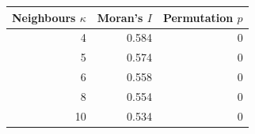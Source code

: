 \begin{tabular}{rrr}
\toprule
Neighbours $\kappa$ & Moran's $I$ & Permutation $p$ \\
\midrule
4 & 0.584 & 0 \\
5 & 0.574 & 0 \\
6 & 0.558 & 0 \\
8 & 0.554 & 0 \\
10 & 0.534 & 0 \\
\bottomrule
\end{tabular}
